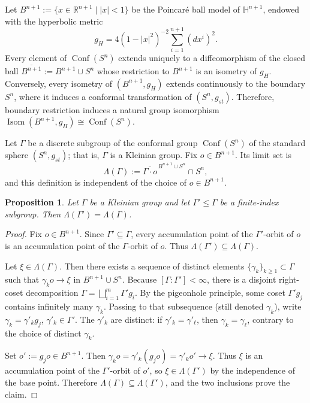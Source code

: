 \documentclass[12pt,oneside,a4paper]{article}
\newtheorem{proposition}[definition]{Proposition}
\theoremstyle{mytheorem}
\theoremstyle{remark}
\theoremstyle{definition}
\begin{document}
Let \( B^{n+1} := \{ x \in \mathbb{R}^{n+1} \mid |x| < 1 \} \) be the Poincar\'e ball model of \(\mathbb H^{n+1}\), endowed with the hyperbolic metric
\[
g_H = 4(1 - |x|^2)^{-2} \sum_{i=1}^{n+1} (dx^i)^2.
\]
Every element of \(\operatorname{Conf}(S^n)\) extends uniquely to a
diffeomorphism of the closed ball
\(\overline{B^{n+1}}:=B^{n+1}\cup S^n\) whose restriction to
\(B^{n+1}\) is an isometry of \(g_H\). Conversely, every isometry of
\((B^{n+1},g_H)\) extends continuously to the boundary \(S^n\), where it
induces a conformal transformation of \((S^n,g_{st})\). Therefore, boundary
restriction induces a natural group isomorphism
\(\operatorname{Isom}(B^{n+1},g_H)\cong\operatorname{Conf}(S^n)\).

Let \( \Gamma \) be a discrete subgroup of the conformal group \( \operatorname{Conf}(S^n) \) of the standard sphere \( (S^n, g_{st}) \); that is, \( \Gamma \) is a Kleinian group. Fix \(o\in B^{n+1}\). Its limit set is
\[
\Lambda(\Gamma):=\overline{\Gamma\cdot o}^{\,B^{n+1}\cup S^n}\cap S^n,
\]
and this definition is independent of the choice of \(o\in B^{n+1}\).



\begin{proposition}\label{virtual}
Let $\Gamma$ be a Kleinian group and let $\Gamma'\leq\Gamma$ be a
finite-index subgroup. Then
$\Lambda(\Gamma')=\Lambda(\Gamma)$.
\end{proposition}
 


\begin{proof}
Fix $o\in B^{n+1}$. Since $\Gamma'\subseteq\Gamma$, every accumulation
point of the $\Gamma'$-orbit of $o$ is an accumulation point of the
$\Gamma$-orbit of $o$. Thus
$\Lambda(\Gamma')\subseteq\Lambda(\Gamma)$.


Let $\xi\in \Lambda(\Gamma)$. Then there exists a sequence of distinct elements $\{\gamma_k\}_{k\ge 1}\subset \Gamma$ such that $\gamma_k o\to \xi$ in $B^{n+1}\cup S^n$. Because $[\Gamma:\Gamma']<\infty$, there is a disjoint right-coset decomposition
$\Gamma=\bigsqcup_{i=1}^{m}\Gamma' g_i.$
By the pigeonhole principle, some coset $\Gamma' g_j$ contains infinitely many $\gamma_k$. Passing to that subsequence (still denoted $\gamma_k$), write
$\gamma_k=\gamma'_k g_j$, $\gamma'_k\in \Gamma'.$ The $\gamma'_k$ are distinct: if $\gamma'_k=\gamma'_\ell$, then $\gamma_k=\gamma_\ell$, contrary to the choice of distinct $\gamma_k$.

Set $o':=g_j o\in B^{n+1}$. Then
$\gamma_k o=\gamma'_k(g_j o)=\gamma'_k o'\to \xi.$ Thus $\xi$
is an accumulation point of the $\Gamma'$-orbit of $o'$, so
$\xi\in\Lambda(\Gamma')$ by the independence of the base point. Therefore
$\Lambda(\Gamma)\subseteq\Lambda(\Gamma')$, and the two inclusions prove the
claim.
\end{proof}
\end{document}
